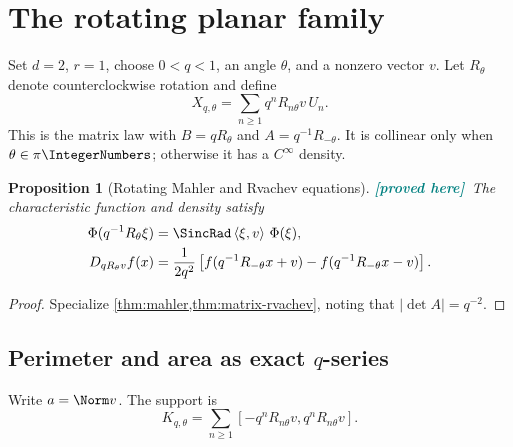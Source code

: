 \documentclass[11pt,oneside]{article}
\newtheorem{proposition}[theorem]{Proposition}
\theoremstyle{definition}
\theoremstyle{remark}
\newcommand{\ip}[2]{\left\langle #1,#2\right\rangle}
\newcommand{\New}{\textcolor{teal}{\textbf{[proved here]}}}
\begin{document}
\section{The rotating planar family}
\label{sec:rotating}

Set $d=2$, $r=1$, choose $0<q<1$, an angle $\theta$, and a nonzero vector $v$.
Let $R_\theta$ denote counterclockwise rotation and define
\begin{equation}
 X_{q,\theta}=\sum_{n\ge1}q^nR_{n\theta}v\,U_n.
 \label{eq:rotating-law}
\end{equation}
This is the matrix law with
$B=qR_\theta$ and $A=q^{-1}R_{-\theta}$.  It is collinear only when
$\theta\in\pi\IntegerNumbers$; otherwise it has a $C^\infty$ density.

\begin{proposition}[Rotating Mahler and Rvachev equations]
\label{prop:rotating-equations}
\New\ The characteristic function and density satisfy
\begin{align}
 \Phi(q^{-1}R_\theta\xi)
 &=\SincRad\ip{\xi}{v}\,\Phi(\xi),
 \label{eq:rotating-mahler}\\
 D_{qR_\theta v}f(x)
 &=\frac1{2q^2}
 \left[f(q^{-1}R_{-\theta}x+v)
       -f(q^{-1}R_{-\theta}x-v)\right].
 \label{eq:rotating-rvachev}
\end{align}
\end{proposition}

\begin{proof}
Specialize \cref{thm:mahler,thm:matrix-rvachev}, noting that
$|\det A|=q^{-2}$.
\end{proof}

\subsection{Perimeter and area as exact \texorpdfstring{$q$}{q}-series}

Write $a=\Norm v$.  The support is
\begin{equation}
 K_{q,\theta}=\sum_{n\ge1}[-q^nR_{n\theta}v,q^nR_{n\theta}v].
 \label{eq:rotating-support}
\end{equation}
\end{document}
